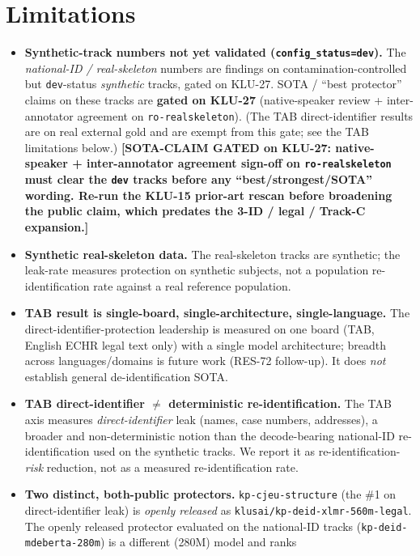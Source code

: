 \documentclass[11pt]{article}
\newcommand{\sotagate}{\textbf{[SOTA-CLAIM GATED on KLU-27: native-speaker + inter-annotator
agreement sign-off on \texttt{ro-realskeleton} must clear the \texttt{dev} tracks before any
``best/strongest/SOTA'' wording. Re-run the KLU-15 prior-art rescan before broadening the public
claim, which predates the 3-ID / legal / Track-C expansion.]}}
\begin{document}
\section{Limitations}
\label{sec:limitations}
\begin{itemize}
  \item \textbf{Synthetic-track numbers not yet validated (\texttt{config\_status=dev}).} The
        \emph{national-ID / real-skeleton} numbers are findings on contamination-controlled but
        \texttt{dev}-status \emph{synthetic} tracks, gated on KLU-27. SOTA / ``best protector'' claims
        on these tracks are \textbf{gated on KLU-27} (native-speaker review + inter-annotator
        agreement on \texttt{ro-realskeleton}). (The TAB direct-identifier results are on real
        external gold and are exempt from this gate; see the TAB limitations below.) \sotagate{}
  \item \textbf{Synthetic real-skeleton data.} The real-skeleton tracks are synthetic; the leak-rate
        measures protection on synthetic subjects, not a population re-identification rate against a
        real reference population.
  \item \textbf{TAB result is single-board, single-architecture, single-language.} The
        direct-identifier-protection leadership is measured on one board (TAB, English ECHR legal
        text only) with a single model architecture; breadth across languages/domains is future work
        (RES-72 follow-up). It does \emph{not} establish general de-identification SOTA.
  \item \textbf{TAB direct-identifier $\neq$ deterministic re-identification.} The TAB axis measures
        \emph{direct-identifier} leak (names, case numbers, addresses), a broader and
        non-deterministic notion than the decode-bearing national-ID re-identification used on the
        synthetic tracks. We report it as re-identification-\emph{risk} reduction, not as a measured
        re-identification rate.
  \item \textbf{Two distinct, both-public protectors.} \texttt{kp-cjeu-structure}
        (the \#1 on direct-identifier leak) is \emph{openly released} as
        \texttt{klusai/kp-deid-xlmr-560m-legal}. The openly released protector evaluated on the
        national-ID tracks (\texttt{kp-deid-mdeberta-280m}) is a different (280M) model and ranks

\end{itemize}
\end{document}
